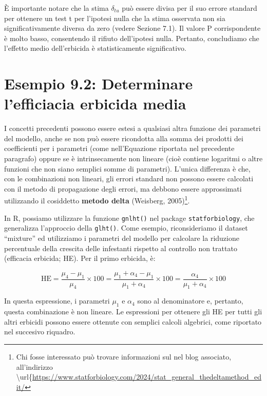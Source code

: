 \documentclass[
  12pt,
]{book}
\begin{document}
È importante notare che la stima \(\delta_{tu}\) può essere divisa per il suo errore standard per ottenere un test t per l'ipotesi nulla che la stima osservata non sia significativamente diversa da zero (vedere Sezione 7.1). Il valore P corrispondente è molto basso, consentendo il rifiuto dell'ipotesi nulla. Pertanto, concludiamo che l'effetto medio dell'erbicida è statisticamente significativo.

\hypertarget{esempio-9.2-determinare-lefficiacia-erbicida-media}{%
\section{Esempio 9.2: Determinare l'efficiacia erbicida media}\label{esempio-9.2-determinare-lefficiacia-erbicida-media}}

I concetti precedenti possono essere estesi a qualsiasi altra funzione dei parametri del modello, anche se non può essere ricondotta alla somma dei prodotti dei coefficienti per i parametri (come nell'Equazione riportata nel precedente paragrafo) oppure se è intrinsecamente non lineare (cioè contiene logaritmi o altre funzioni che non siano semplici somme di parametri). L'unica differenza è che, con le combinazioni non lineari, gli errori standard non possono essere calcolati con il metodo di propagazione degli errori, ma debbono essere approssimati utilizzando il cosiddetto \textbf{metodo delta} (Weisberg, 2005)\footnote{Chi fosse interessato può trovare informazioni sul nel blog associato, all'indirizzo \textbackslash url\{\url{https://www.statforbiology.com/2024/stat_general_thedeltamethod_edit/}}.

In R, possiamo utilizzare la funzione \texttt{gnlht()} nel package \texttt{statforbiology}, che generalizza l'approccio della \texttt{glht()}. Come esempio, riconsideriamo il dataset ``mixture'' ed utilizziamo i parametri del modello per calcolare la riduzione percentuale della crescita delle infestanti rispetto al controllo non trattato (efficacia erbicida; HE). Per il primo erbicida, è:

\[\textrm{HE} = \frac{\mu_4 - \mu_1}{\mu_4} \times 100 = \frac{\mu_1 + \alpha_4 - \mu_1}{\mu_1 + \alpha_4} \times 100 = \frac{\alpha_4}{\mu_1 + \alpha_4} \times 100\]

In questa espressione, i parametri \(\mu_1\) e \(\alpha_4\) sono al denominatore e, pertanto, questa combinazione è non lineare. Le espressioni per ottenere gli HE per tutti gli altri erbicidi possono essere ottenute con semplici calcoli algebrici, come riportato nel succesivo riquadro.
\end{document}
